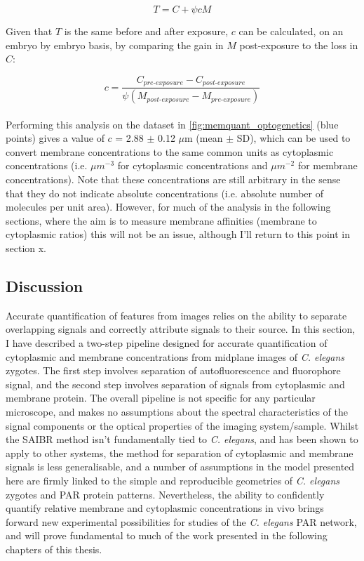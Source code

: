 \documentclass[12pt]{"report"}
\begin{document}
\begin{equation}
T = C + \psi c M
\label{eq:t}
\end{equation}

Given that $T$ is the same before and after exposure, $c$ can be calculated, on an embryo by embryo basis, by comparing the gain in $M$ post-exposure to the loss in $C$:

\begin{equation}
c = \frac{C_{pre \textrm{-} exposure} - C_{post  \textrm{-} exposure}}{\psi (M_{post  \textrm{-} exposure} - M_{pre  \textrm{-} exposure})}
\end{equation}\\

Performing this analysis on the dataset in \cref{fig:memquant_optogenetics} (blue points) gives a value of $c$ = 2.88 $\pm$ 0.12 $\mu$m (mean $\pm$ SD), which can be used to convert membrane concentrations to the same common units as cytoplasmic concentrations (i.e. $\mu m^{-3}$ for cytoplasmic concentrations and $\mu m^{-2}$ for membrane concentrations). Note that these concentrations are still arbitrary in the sense that they do not indicate absolute concentrations (i.e. absolute number of molecules per unit area). However, for much of the analysis in the following sections, where the aim is to measure membrane affinities (membrane to cytoplasmic ratios) this will not be an issue, although I'll return to this point in section x.\\

\clearpage
\subsection{Discussion}

Accurate quantification of features from images relies on the ability to separate overlapping signals and correctly attribute signals to their source. In this section, I have described a two-step pipeline designed for accurate quantification of cytoplasmic and membrane concentrations from midplane images of \textit{C. elegans} zygotes. The first step involves separation of autofluorescence and fluorophore signal, and the second step involves separation of signals from cytoplasmic and membrane protein. The overall pipeline is not specific for any particular microscope, and makes no assumptions about the spectral characteristics of the signal components or the optical properties of the imaging system/sample. Whilst the SAIBR method isn't fundamentally tied to \textit{C. elegans}, and has been shown to apply to other systems, the method for separation of cytoplasmic and membrane signals is less generalisable, and a number of assumptions in the model presented here are firmly linked to the simple and reproducible geometries of \textit{C. elegans} zygotes and PAR protein patterns. Nevertheless, the ability to confidently quantify relative membrane and cytoplasmic concentrations in vivo brings forward new experimental possibilities for studies of the \textit{C. elegans} PAR network, and will prove fundamental to much of the work presented in the following chapters of this thesis.\\
\end{document}
